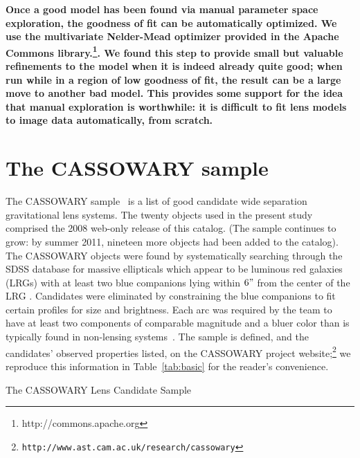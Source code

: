\documentclass[iop]{emulateapj}
\def\NEW#1{{\bf{#1}}}
\begin{document}
\NEW{Once a good model has been found via manual parameter space exploration, 
the goodness of fit can be automatically optimized. We use the multivariate
Nelder-Mead optimizer provided in the Apache Commons
library.\footnote{http://commons.apache.org}. We found this step  to provide
small but valuable refinements to the model when it is indeed already quite
good; when run while in a region of low goodness of fit, the result can be a
large move to another bad model. This provides some support for the idea that
manual exploration is worthwhile: it is difficult to fit lens models to image
data  automatically, from scratch.}



\section{The CASSOWARY sample}
\label{sec:sample}

The CASSOWARY sample~\citep{Bel++09} is a list of good candidate  wide
separation gravitational lens systems. The twenty objects used in the present
study comprised the 2008 web-only  release of this catalog. (The sample
continues to grow: by summer 2011, nineteen more objects had been added to
the catalog).  The CASSOWARY objects were found by systematically searching
through the SDSS database for massive ellipticals which appear to be luminous
red galaxies (LRGs) with at least two blue companions lying within $6"$ from the
center of the LRG \citep{Bel++09}.  Candidates were eliminated by constraining
the blue companions to fit certain profiles for size and brightness. Each arc
was required by the team  to have at least two components of comparable
magnitude and a bluer color than is typically found in non-lensing
systems~\citep[][]{Bel++09}. The sample is defined, and  the candidates'
observed properties listed, on the CASSOWARY project
website;\footnote{\texttt{http://www.ast.cam.ac.uk/research/cassowary}} we
reproduce this information in Table~\ref{tab:basic} for the reader's
convenience.

\begin{center}
\begin{table}
\begin{center}
\caption{The CASSOWARY Lens Candidate Sample}

\label{tab:basic}
\end{center}
\end{table}
\end{center}
\end{document}
